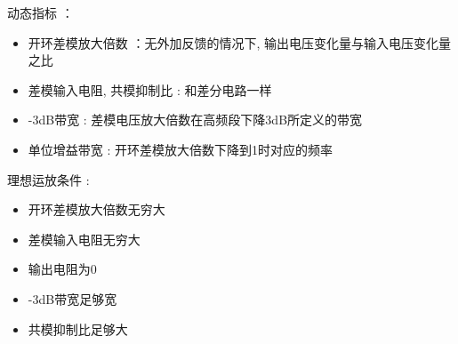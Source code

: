 \documentclass[UTF8, 12pt]{ctexart}
\begin{document}
	动态指标 ：
	\begin{itemize}[leftmargin = 4em]
		\item 开环差模放大倍数 ：无外加反馈的情况下,  输出电压变化量与输入电压变化量之比
		\item 差模输入电阻, 共模抑制比 : 和差分电路一样
		\item -3dB带宽 : 差模电压放大倍数在高频段下降3dB所定义的带宽
		\item 单位增益带宽 : 开环差模放大倍数下降到1时对应的频率
	\end{itemize}

	理想运放条件 :
	\begin{itemize}[leftmargin = 4em]
		\item 开环差模放大倍数无穷大
		\item 差模输入电阻无穷大
		\item 输出电阻为0
		\item -3dB带宽足够宽
		\item 共模抑制比足够大
	\end{itemize}
	
\end{document}

